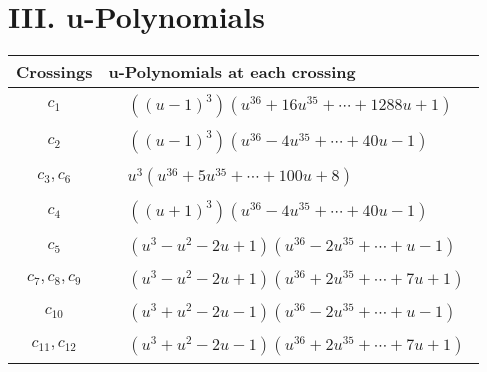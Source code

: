 \documentclass[1p]{elsarticle_modified}
\theoremstyle{definition}
\begin{document}
\newpage\renewcommand{\arraystretch}{1}
\centering \section*{ III. u-Polynomials}
\begin{tabular}{m{50pt}|m{274pt}}
Crossings & \hspace{64pt}u-Polynomials at each crossing \\
\hline $$\begin{aligned}c_{1}\end{aligned}$$&$\begin{aligned}
&((u-1)^3)(u^{36}+16 u^{35}+\cdots+1288 u+1)
\end{aligned}$\\
\hline $$\begin{aligned}c_{2}\end{aligned}$$&$\begin{aligned}
&((u-1)^3)(u^{36}-4 u^{35}+\cdots+40 u-1)
\end{aligned}$\\
\hline $$\begin{aligned}c_{3},c_{6}\end{aligned}$$&$\begin{aligned}
&u^3(u^{36}+5 u^{35}+\cdots+100 u+8)
\end{aligned}$\\
\hline $$\begin{aligned}c_{4}\end{aligned}$$&$\begin{aligned}
&((u+1)^3)(u^{36}-4 u^{35}+\cdots+40 u-1)
\end{aligned}$\\
\hline $$\begin{aligned}c_{5}\end{aligned}$$&$\begin{aligned}
&(u^3- u^2-2 u+1)(u^{36}-2 u^{35}+\cdots+u-1)
\end{aligned}$\\
\hline $$\begin{aligned}c_{7},c_{8},c_{9}\end{aligned}$$&$\begin{aligned}
&(u^3- u^2-2 u+1)(u^{36}+2 u^{35}+\cdots+7 u+1)
\end{aligned}$\\
\hline $$\begin{aligned}c_{10}\end{aligned}$$&$\begin{aligned}
&(u^3+u^2-2 u-1)(u^{36}-2 u^{35}+\cdots+u-1)
\end{aligned}$\\
\hline $$\begin{aligned}c_{11},c_{12}\end{aligned}$$&$\begin{aligned}
&(u^3+u^2-2 u-1)(u^{36}+2 u^{35}+\cdots+7 u+1)
\end{aligned}$\\
\hline
\end{tabular}\newpage\renewcommand{\arraystretch}{1}
\end{document}
